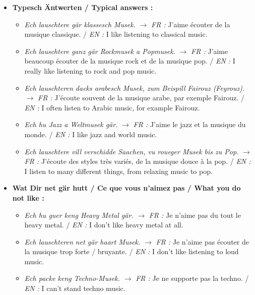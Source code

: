 \begin{itemize}
    \vspace{0.4em}

    \item \textbf{Typesch Äntwerten / Typical answers :}
    \begin{itemize}
        \item \textit{Ech lauschtere gär klassesch Musek.} $\rightarrow$ \textit{FR :} J'aime écouter de la musique classique. / \textit{EN :} I like listening to classical music.
        \item \textit{Ech lauschtere ganz gär Rockmusek a Popmusek.} $\rightarrow$ \textit{FR :} J'aime beaucoup écouter de la musique rock et de la musique pop. / \textit{EN :} I really like listening to rock and pop music.
        \item \textit{Ech lauschteren dacks arabesch Musek, zum Beispill Fairouz (Feyrouz).} $\rightarrow$ \textit{FR :} J'écoute souvent de la musique arabe, par exemple Fairouz. / \textit{EN :} I often listen to Arabic music, for example Fairouz.
        \item \textit{Ech hu Jazz a Weltmusek gär.} $\rightarrow$ \textit{FR :} J'aime le jazz et la musique du monde. / \textit{EN :} I like jazz and world music.
        \item \textit{Ech lauschtere vill verschidde Saachen, vu roueger Musek bis zu Pop.} $\rightarrow$ \textit{FR :} J'écoute des styles très variés, de la musique douce à la pop. / \textit{EN :} I listen to many different things, from relaxing music to pop.
    \end{itemize}

    \vspace{0.4em}

    \item \textbf{Wat Dir net gär hutt / Ce que vous n'aimez pas / What you do not like :}
    \begin{itemize}
        \item \textit{Ech hu guer keng Heavy Metal gär.} $\rightarrow$ \textit{FR :} Je n'aime pas du tout le heavy metal. / \textit{EN :} I don't like heavy metal at all.
        \item \textit{Ech lauschteren net gär haart Musek.} $\rightarrow$ \textit{FR :} Je n'aime pas écouter de la musique trop forte / bruyante. / \textit{EN :} I don't like listening to loud music.
        \item \textit{Ech packe keng Techno-Musek.} $\rightarrow$ \textit{FR :} Je ne supporte pas la techno. / \textit{EN :} I can't stand techno music.
    \end{itemize}


\end{itemize}
